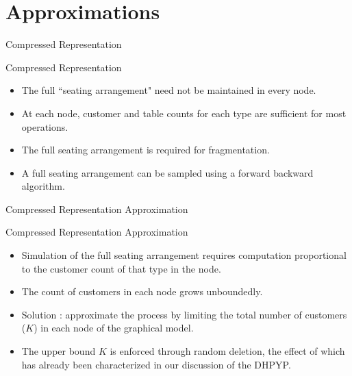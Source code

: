 \documentclass{beamer}
\begin{document}
\section{Approximations}

\begin{frame}[t]{Compressed Representation}
	
	\begin{block}{Compressed Representation \cite{Gasthaus2011}}
		\begin{itemize}
			\item The full ``seating arrangement" need not be maintained in every node.
			\item At each node, customer and table counts for each type are sufficient for most operations.
			\item The full seating arrangement is required for fragmentation.
			\item A full seating arrangement can be sampled using a forward backward algorithm.
		\end{itemize}
	\end{block}
	
\end{frame}

\begin{frame}[t]{Compressed Representation Approximation}
	
	\begin{block}{Compressed Representation Approximation}
		\begin{itemize}
			\item Simulation of the full seating arrangement requires computation proportional to the customer count of that type in the node.
			\item The count of customers in each node grows unboundedly.
			\item Solution : approximate the process by limiting the total number of customers ($K$) in each node of the graphical model.
			\item The upper bound $K$ is enforced through random deletion, the effect of which has already been characterized in our discussion of the DHPYP.
		\end{itemize}
	\end{block}
	
\end{frame}
\end{document}
